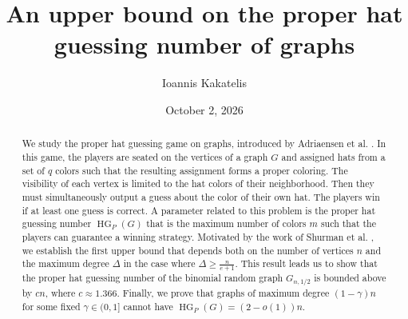 \documentclass[11pt, letterpaper]{article}
\theoremstyle{plain}
\theoremstyle{plain}
\begin{document}
\title{An upper bound on the proper hat guessing number of graphs}
\author{Ioannis Kakatelis}
\date{October 2, 2026}

\maketitle

\begin{abstract}
We study the proper hat guessing game on graphs, introduced by Adriaensen et al. \cite{adriaensen2026hatguessingpropercolorings}. In this game, the players are seated on the vertices of a graph $G$ and assigned hats from a set of $q$ colors such that the resulting assignment forms a proper coloring. The visibility of each vertex is limited to the hat colors of their neighborhood. Then they must simultaneously output a guess about the color of their own hat. The players win if at least one guess is correct. A parameter related to this problem is the proper hat guessing number $\operatorname{HG}_{P}(G)$ that is the maximum number of colors $m$ such that the players can guarantee a winning strategy. Motivated by the work of Shurman et al. \cite{shurman2026upper}, we establish the first upper bound that depends both on the number of vertices $n$ and the maximum degree $\Delta$ in the case where $\Delta \geq \frac{n}{e+1}$. This result leads us to show that the proper hat guessing number of the binomial random graph $G_{n,1/2}$ is bounded above by $cn$, where $c \approx 1.366$. Finally, we prove that graphs of maximum degree $(1-\gamma)n$ for some fixed $\gamma \in (0,1]$ cannot have $\operatorname{HG}_{P}(G) = (2-o(1))n$.
\end{abstract}
\end{document}
